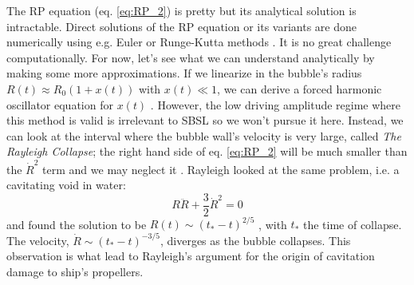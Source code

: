 \documentclass[prb,aps,nofootinbib,superscriptaddress,floatfix]{revtex4-2}
\begin{document}
The RP equation (eq. \ref{eq:RP_2}) is pretty but its analytical solution is intractable. Direct solutions of the RP equation or its variants are done numerically using e.g. Euler or Runge-Kutta methods \cite{yasui2018acoustic,yasui2015dynamics}. It is no great challenge computationally. For now, let's see what we can understand analytically by making some more approximations. If we linearize in the bubble's radius $R(t)\approx R_0 \left( 1+x(t) \right)$ with $x(t) \ll 1$, we can derive a forced harmonic oscillator equation for $x(t)$ \cite{brennen2014cavitation,yasui2018acoustic}. However, the low driving amplitude regime where this method is valid is irrelevant to SBSL so we won't pursue it here. Instead, we can look at the interval where the bubble wall's velocity is very large, called \emph{The Rayleigh Collapse}; the right hand side of eq. \ref{eq:RP_2} will be much smaller than the $\dot{R}^2$ term and we may neglect it \cite{rayleigh1917pressure,plesset1949dynamics,prosperetti1999old,brenner2002single}. 
Rayleigh looked at the same problem, i.e. a cavitating void in water:
\begin{equation}
    R\ddot{R}+\frac{3}{2}\dot{R}^2=0
    \label{eq:Rayleigh}
\end{equation}
and found the solution to be $R(t)\sim\left(t_*-t\right)^{2/5}$ \cite{brenner2002single}, with $t_*$ the time of collapse. The velocity, $\dot{R}\sim\left(t_*-t \right)^{-3/5}$, diverges as the bubble collapses. This observation is what lead to Rayleigh's argument for the origin of cavitation damage to ship's propellers. %
\end{document}
